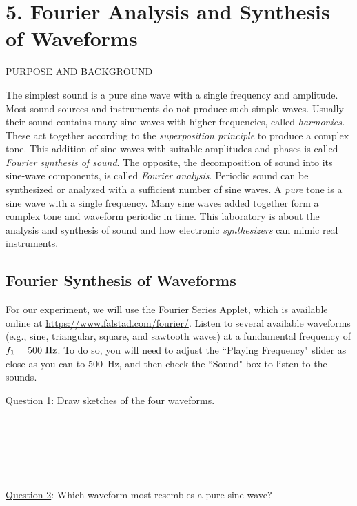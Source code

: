 \documentclass[11pt]{NSF}
\begin{document}
     
\section{5. Fourier Analysis and Synthesis of Waveforms}

PURPOSE AND BACKGROUND

The simplest sound is a pure sine wave with a single frequency and amplitude.
Most sound sources and instruments do not produce such simple waves. Usually
their sound contains many sine waves with higher frequencies, called {\em harmonics.}
These act together according to the {\em superposition principle} to produce a
complex tone. This addition of sine waves with suitable amplitudes and phases
is called {\em Fourier synthesis of sound}. 
The opposite, the decomposition of sound
into its sine-wave components, is called {\em Fourier analysis}. 
Periodic sound can
be synthesized or analyzed with a sufficient number of sine waves. 
A {\em pure} tone is a sine wave with a single frequency. 
Many sine waves added together form a
complex tone and waveform periodic in time. This laboratory is about the
analysis and synthesis of sound and how electronic 
{\em synthesizers} can mimic real instruments.

\subsection{Fourier Synthesis of Waveforms}

For our experiment, we will use the 
Fourier Series Applet, which is available online at 
\url{https://www.falstad.com/fourier/}.
Listen to several available waveforms (e.g.,  sine, triangular, 
square, and sawtooth waves) at a fundamental frequency of 
$f_1 = 500~{\rm Hz}$.
To do so, you will need to adjust the ``Playing Frequency" 
slider as close as you can to 500~Hz,  
and then check the ``Sound" box to listen to the sounds.


\underline{Question 1}: Draw sketches of the four waveforms.
\\
\\
\\
\\
\\
\\
\\

\underline{Question 2}: Which waveform most resembles a pure sine wave?
\\
\\
\\
\end{document}
